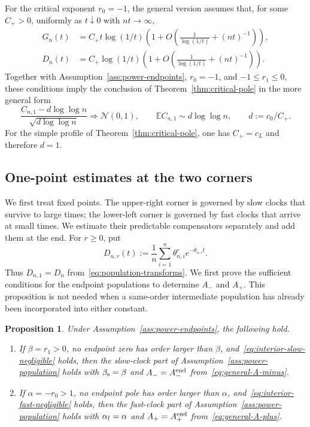 \documentclass[11pt]{article}
\newtheorem{proposition}[theorem]{Proposition}
\theoremstyle{remark}
\theoremstyle{plain}
\newcommand{\E}{\mathbb E}
\begin{document}
For the critical exponent $r_0=-1$, the general version assumes that, for
some $C_+>0$, uniformly as $t\downarrow0$ with $nt\to\infty$,
\begin{align}
 G_n(t)&=C_+t\log(1/t)
 \left(1+O\left(\frac1{\log(1/t)}+(nt)^{-1}\right)\right),
 \label{eq:critical-arrival-tail}\\
 D_n(t)&=C_+\log(1/t)
 \left(1+O\left(\frac1{\log(1/t)}+(nt)^{-1}\right)\right).
 \label{eq:critical-arrival-weight}
\end{align}
Together with Assumption~\ref{ass:power-endpoints}, $r_0=-1$, and
$-1\le r_1\le0$, these conditions imply the conclusion of
Theorem~\ref{thm:critical-pole} in the more general form
\begin{equation}\label{eq:critical-pole-coefficient}
 \frac{C_{n,1}-d\log\log n}{\sqrt{d\log\log n}}
 \Longrightarrow\mathcal N(0,1),\qquad
 \E C_{n,1}\sim d\log\log n,\qquad d:=c_0/C_+.
\end{equation}
For the simple profile of Theorem~\ref{thm:critical-pole}, one has
$C_+=c_L$ and therefore $d=1$.

\subsection{One-point estimates at the two corners}

We first treat fixed points.  The upper-right corner is governed by slow
clocks that survive to large times; the lower-left corner is governed by fast
clocks that arrive at small times.  We estimate their predictable
compensators separately and add them at the end.  For $r\ge0$, put
\begin{equation}\label{eq:tail-moments}
 D_{n,r}(t):=\frac1n\sum_{i=1}^n
 \theta_{n,i}^r e^{-\theta_{n,i}t}.
\end{equation}
Thus $D_{n,1}=D_n$ from~\eqref{eq:population-transforms}.  We first prove the
sufficient conditions for the endpoint populations to determine $A_-$ and
$A_+$.  This proposition is not needed when a same-order intermediate
population has already been incorporated into either constant.

\begin{proposition}\label{prop:global-endpoint-tails}
Under Assumption~\ref{ass:power-endpoints}, the following hold.
\begin{enumerate}[label=(\roman*)]
\item If $\beta=r_1>0$, no endpoint zero has order larger than $\beta$,
and~\eqref{eq:interior-slow-negligible} holds, then the slow-clock part of
Assumption~\ref{ass:power-population} holds with
$\beta_{\rm s}=\beta$ and
$A_-=A_-^{\rm end}$ from~\eqref{eq:general-A-minus}.
\item If $\alpha=-r_0>1$, no endpoint pole has order larger than $\alpha$,
and~\eqref{eq:interior-fast-negligible} holds, then the fast-clock part of
Assumption~\ref{ass:power-population} holds with
$\alpha_{\rm f}=\alpha$ and
$A_+=A_+^{\rm end}$ from~\eqref{eq:general-A-plus}.
\end{enumerate}
\end{proposition}
\end{document}

